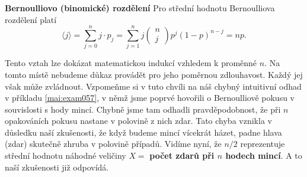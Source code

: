 \wikitextrule
\begin{example}\label{mai:exam066}
  \textbf{Bernoulliovo (binomické) rozdělení}\newline\small
  Pro střední hodnotu Bernoulliova rozdělení platí
  \begin{equation*}
    \langle j \rangle = \sum_{j=0}^{n}j\cdot p_j
      = \sum_{j=1}^{n}j\begin{pmatrix} n \\ j \end{pmatrix}p^j(1-p)^{n-j} = np.
  \end{equation*}
  
  Tento vztah lze dokázat matematickou indukcí vzhledem k proměnné \(n\). Na tomto místě nebudeme 
  důkaz provádět pro jeho poměrnou zdlouhavost. Každý jej však může zvládnout. Vzpomeňme si v tuto 
  chvíli na náš chybný intuitivní odhad v příkladu \ref{mai:exam057}, v němž jsme poprvé hovořili o 
  Bernoulliově pokusu v souvislosti s hody mincí. Chybně jsme tam odhadli pravděpodobnost, že při 
  \(n\) opakováních pokusu nastane v polovině z nich zdar. Tato chyba vznikla v důsledku naší 
  zkušenosti, že když budeme mincí vícekrát házet, padne hlava (zdar) skutečně zhruba v polovině 
  případů. Vidíme nyní, že \(n/2\) reprezentuje střední hodnotu náhodné veličiny \(X =\) 
  \textbf{počet zdarů při \(n\) hodech mincí}. A to naší zkušenosti již odpovídá.
\normalsize
\end{example}